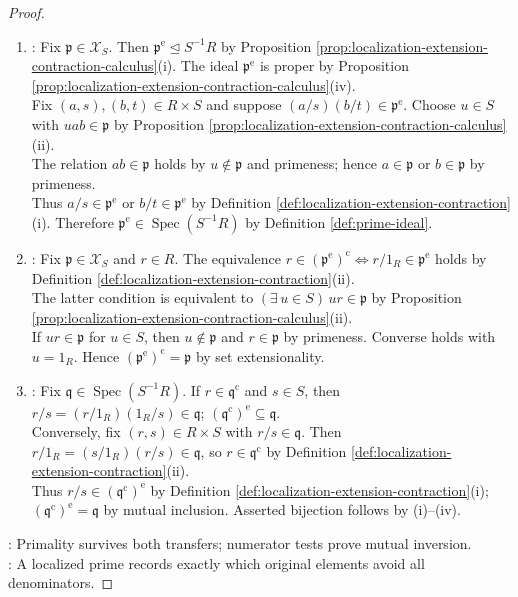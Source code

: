 \begin{theorem}
\begin{proof}
\begin{enumerate}[label=(\roman*)]
\item {}: Fix $\mathfrak{p}\in\mathcal{X}_S$. Then $\mathfrak{p}^{\mathrm{e}}\trianglelefteq S^{-1}R$ by Proposition \ref{prop:localization-extension-contraction-calculus}(i). The ideal $\mathfrak{p}^{\mathrm{e}}$ is proper by Proposition \ref{prop:localization-extension-contraction-calculus}(iv).\\
Fix $(a,s),(b,t)\in R\times S$ and suppose $(a/s)(b/t)\in\mathfrak{p}^{\mathrm{e}}$. Choose $u\in S$ with $uab\in\mathfrak{p}$ by Proposition \ref{prop:localization-extension-contraction-calculus}(ii).\\
The relation $ab\in\mathfrak{p}$ holds by $u\notin\mathfrak{p}$ and primeness; hence $a\in\mathfrak{p}$ or $b\in\mathfrak{p}$ by primeness.\\
Thus $a/s\in\mathfrak{p}^{\mathrm{e}}$ or $b/t\in\mathfrak{p}^{\mathrm{e}}$ by Definition \ref{def:localization-extension-contraction}(i). Therefore $\mathfrak{p}^{\mathrm{e}}\in\operatorname{Spec}(S^{-1}R)$ by Definition \ref{def:prime-ideal}.
\item {}: Fix $\mathfrak{p}\in\mathcal{X}_S$ and $r\in R$. The equivalence $r\in(\mathfrak{p}^{\mathrm{e}})^{\mathrm{c}}\Longleftrightarrow r/1_R\in\mathfrak{p}^{\mathrm{e}}$ holds by Definition \ref{def:localization-extension-contraction}(ii).\\
The latter condition is equivalent to $(\exists\,u\in S)\,ur\in\mathfrak{p}$ by Proposition \ref{prop:localization-extension-contraction-calculus}(ii).\\
If $ur\in\mathfrak{p}$ for $u\in S$, then $u\notin\mathfrak{p}$ and $r\in\mathfrak{p}$ by primeness. Converse holds with $u=1_R$. Hence $(\mathfrak{p}^{\mathrm{e}})^{\mathrm{c}}=\mathfrak{p}$ by set extensionality.
\item {}: Fix $\mathfrak{q}\in\operatorname{Spec}(S^{-1}R)$. If $r\in\mathfrak{q}^{\mathrm{c}}$ and $s\in S$, then $r/s=(r/1_R)(1_R/s)\in\mathfrak{q}$; $(\mathfrak{q}^{\mathrm{c}})^{\mathrm{e}}\subseteq\mathfrak{q}$.\\
Conversely, fix $(r,s)\in R\times S$ with $r/s\in\mathfrak{q}$. Then $r/1_R=(s/1_R)(r/s)\in\mathfrak{q}$, so $r\in\mathfrak{q}^{\mathrm{c}}$ by Definition \ref{def:localization-extension-contraction}(ii).\\
Thus $r/s\in(\mathfrak{q}^{\mathrm{c}})^{\mathrm{e}}$ by Definition \ref{def:localization-extension-contraction}(i); $(\mathfrak{q}^{\mathrm{c}})^{\mathrm{e}}=\mathfrak{q}$ by mutual inclusion. Asserted bijection follows by (i)--(iv).
\end{enumerate}
: Primality survives both transfers; numerator tests prove mutual inversion.\\
: A localized prime records exactly which original elements avoid all denominators.
\end{proof}
\end{theorem}

